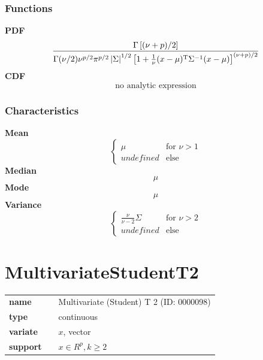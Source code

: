 \subsubsection*{Functions}

\smallskip \noindent \hspace{.2cm} \textbf{PDF} 
\begin{equation*}\frac{\Gamma\left[(\nu+p)/2\right]}{\Gamma(\nu/2)\nu^{p/2}\pi^{p/2}\left|\Sigma\right|^{1/2}\left[1+\frac{1}{\nu}(x-\mu)^{\rm T}\Sigma^{-1}(x-\mu)\right]^{(\nu+p)/2}}\end{equation*}
\smallskip \noindent \hspace{.2cm} \textbf{CDF} 
\begin{equation*}\text{no analytic expression}\end{equation*}
\smallskip
\subsubsection*{Characteristics}
\smallskip \noindent \hspace{.2cm} \textbf{Mean} 
\begin{equation*}\begin{cases}
\mu & \text{for }\nu > 1 \\
undefined & \text{else} 
\end{cases}\end{equation*}
\smallskip \noindent \hspace{.2cm} \textbf{Median} 
\begin{equation*}\mu\end{equation*}
\smallskip \noindent \hspace{.2cm} \textbf{Mode} 
\begin{equation*}\mu\end{equation*}
\smallskip \noindent \hspace{.2cm} \textbf{Variance} 
\begin{equation*}\begin{cases}
\frac{\nu}{\nu-2} \Sigma & \text{for }\nu > 2 \\
undefined & \text{else} 
\end{cases}\end{equation*}
\smallskip
\section*{MultivariateStudentT2} 

  \bigskip 

\begin{tabular}{p{2cm}cl}
\textbf{name} & & Multivariate (Student) T 2 (ID: 0000098)\\ 
 
\textbf{type} & & continuous \\ 

\textbf{variate} & & $x$, vector \\ 

\textbf{support} & & $x \in R^p, k\geq 2$
\end{tabular}

